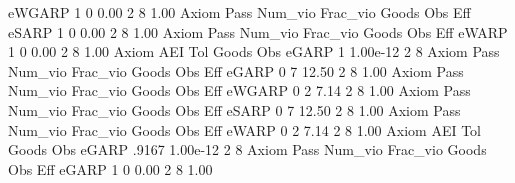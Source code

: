       eWGARP {\VBAR}    1           0        0.00           2           8        1.00  
{\smallskip}
{\smallskip}
{\smallskip}
       Axiom {\VBAR} Pass     Num_vio    Frac_vio       Goods         Obs         Eff  
       eSARP {\VBAR}    1           0        0.00           2           8        1.00  
{\smallskip}
{\smallskip}
{\smallskip}
       Axiom {\VBAR} Pass     Num_vio    Frac_vio       Goods         Obs         Eff  
       eWARP {\VBAR}    1           0        0.00           2           8        1.00  
{\smallskip}
       Axiom {\VBAR}       AEI        Tol      Goods        Obs 
       eGARP {\VBAR}         1   1.00e-12          2          8 
{\smallskip}
{\smallskip}
{\smallskip}
       Axiom {\VBAR} Pass     Num_vio    Frac_vio       Goods         Obs         Eff  
       eGARP {\VBAR}    0           7       12.50           2           8        1.00  
{\smallskip}
{\smallskip}
{\smallskip}
       Axiom {\VBAR} Pass     Num_vio    Frac_vio       Goods         Obs         Eff  
      eWGARP {\VBAR}    0           2        7.14           2           8        1.00  
{\smallskip}
{\smallskip}
{\smallskip}
       Axiom {\VBAR} Pass     Num_vio    Frac_vio       Goods         Obs         Eff  
       eSARP {\VBAR}    0           7       12.50           2           8        1.00  
{\smallskip}
{\smallskip}
{\smallskip}
       Axiom {\VBAR} Pass     Num_vio    Frac_vio       Goods         Obs         Eff  
       eWARP {\VBAR}    0           2        7.14           2           8        1.00  
{\smallskip}
       Axiom {\VBAR}       AEI        Tol      Goods        Obs 
       eGARP {\VBAR}     .9167   1.00e-12          2          8 
{\smallskip}
{\smallskip}
{\smallskip}
       Axiom {\VBAR} Pass     Num_vio    Frac_vio       Goods         Obs         Eff  
       eGARP {\VBAR}    1           0        0.00           2           8        1.00  
{\smallskip}
{\smallskip}
